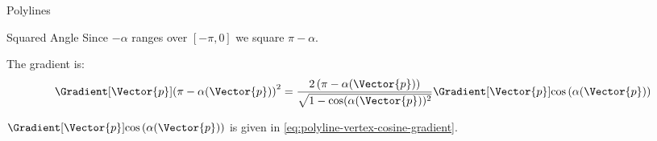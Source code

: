 \begin{plSection}{Polylines}
\begin{plSection}{Squared Angle}
Since $-\alpha$ ranges over $[-\pi,0]$
we square $\pi - \alpha$.

The gradient is:
\begin{equation}
\Gradient[\Vector{p}]{\left( \pi - \alpha(\Vector{p}) \right)^2}
=
{{2 \left( \pi - \alpha(\Vector{p}) \right)}
\over
{\sqrt{ 1 - \cos(\alpha(\Vector{p}))^2}}}
\Gradient[\Vector{p}]{\cos\left(\alpha(\Vector{p})\right)}
\end{equation}

$\Gradient[\Vector{p}]{\cos \left( \alpha(\Vector{p}) \right)}$ is given
in \cref{eq:polyline-vertex-cosine-gradient}.

\end{plSection}%
\end{plSection}%
